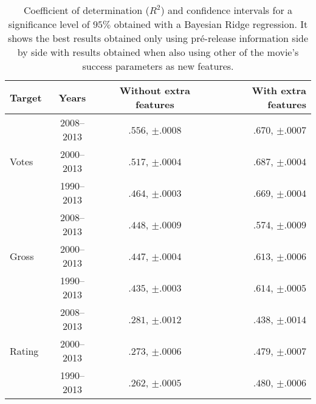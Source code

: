 
\begin{table}[tb]
\caption{\label{tab:years_results_super}Coefficient of determination ($R^2$) and
confidence intervals for a significance level of $95\%$ obtained with a
Bayesian Ridge regression. It shows the best results obtained only using
pré-release information side by side with results obtained when also using
other of the movie's success parameters as new features.} 
\centering
\begin{tabular}{lccr}
\toprule
Target                  & Years      & Without extra features    & With extra features \\
\midrule
\multirow{3}{*}{Votes}
& 2008--2013   & $.556$, {\tiny $\pm$}$.0008$ & $.670$, {\tiny $\pm$}$.0007$ \\
& 2000--2013   & $.517$, {\tiny $\pm$}$.0004$ & $.687$, {\tiny $\pm$}$.0004$ \\
& 1990--2013   & $.464$, {\tiny $\pm$}$.0003$ & $.669$, {\tiny $\pm$}$.0004$ \\
\midrule
\multirow{3}{*}{Gross}
& 2008--2013   & $.448$, {\tiny $\pm$}$.0009$ & $.574$, {\tiny $\pm$}$.0009$ \\
& 2000--2013   & $.447$, {\tiny $\pm$}$.0004$ & $.613$, {\tiny $\pm$}$.0006$ \\
& 1990--2013   & $.435$, {\tiny $\pm$}$.0003$ & $.614$, {\tiny $\pm$}$.0005$ \\
\midrule
\multirow{3}{*}{Rating}
& 2008--2013   & $.281$, {\tiny $\pm$}$.0012$ & $.438$, {\tiny $\pm$}$.0014$ \\
& 2000--2013   & $.273$, {\tiny $\pm$}$.0006$ & $.479$, {\tiny $\pm$}$.0007$ \\
& 1990--2013   & $.262$, {\tiny $\pm$}$.0005$ & $.480$, {\tiny $\pm$}$.0006$ \\
\bottomrule
\end{tabular}
\end{table}
